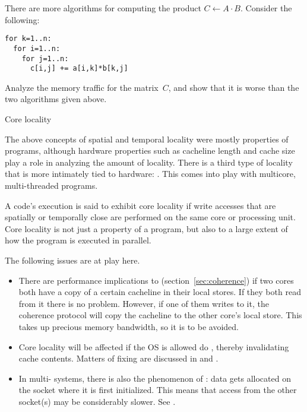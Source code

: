 \begin{exercise}
  There are more algorithms for computing the product $C\leftarrow
  A\cdot B$. Consider the following:
\begin{verbatim}
for k=1..n:
  for i=1..n:
    for j=1..n:
      c[i,j] += a[i,k]*b[k,j]
\end{verbatim}
Analyze the memory traffic for the matrix~$C$, and show that it is
worse than the two algorithms given above.
\end{exercise}

\begin{comment}
 The following program is likely inefficient if
\texttt{n} is small and \texttt{N} is large:
\begin{verbatim}
for (i=0; i<N; i++)
  for (j=0; j<n; j++)
    ... = ... x[j*N+i] ...
\end{verbatim}
Reversing the loops, when possible, is likely to make the code more
efficient:
\begin{verbatim}
for (j=0; j<n; j++)
  for (i=0; i<N; i++)
    ... = ... x[j*N+i] ...
\end{verbatim}
\end{comment}

 {Core locality}

The above concepts of spatial and temporal locality were mostly
properties of programs, although hardware properties such as cacheline
length and cache size play a role in analyzing the amount of
locality. There is a third type of locality that is more intimately
tied to hardware: .
This comes into play with multicore, multi-threaded programs.

A code's execution is said to exhibit core locality if write accesses
that are spatially or temporally close are performed on the same core
or processing unit.
Core locality is not just a property of a program, but also to a large
extent of how the program is executed in parallel.

The following issues are at play here.
\begin{itemize}
\item
  There are performance implications to 
  (section~\ref{sec:coherence})
  if two cores both have a copy of a certain cacheline in their local stores.
  If they both read from it there is no problem. However, if one of them
  writes to it, the coherence protocol will copy the cacheline to the
  other core's local store. This takes up precious memory bandwidth, so
  it is to be avoided.
\item Core locality will be affected if the \ac{OS} is allowed do
  , thereby invalidating cache contents.
  Matters of fixing  are discussed in
   and .
\item In multi- systems, there is also the phenomenon of
  : data gets allocated on the socket where
  it is first initialized.
  This means that access from the other socket(s) may be considerably slower.
  See .
\end{itemize}


